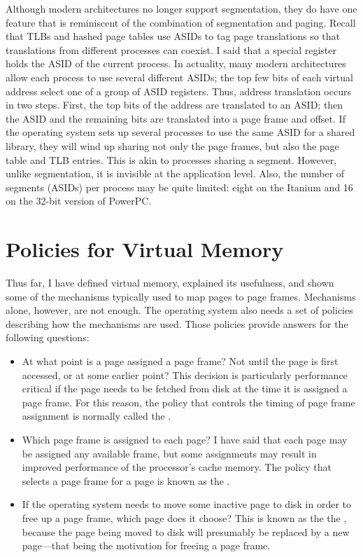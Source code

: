 Although modern architectures no longer support segmentation, they do have one
feature that is reminiscent of the combination of segmentation and
paging.  Recall that TLBs and hashed page tables use ASIDs to tag page
translations so that translations from different processes can
coexist.  I said that a special register holds the ASID of the
current process.  In actuality, many modern architectures allow each
process to use several different ASIDs; the top few bits of each
virtual address select one of a group of ASID registers.  Thus,
address translation occurs in two steps.  First, the top bits of the
address are translated to an ASID; then the ASID and the remaining
bits are translated into a page frame and offset.  If the operating
system sets up several processes to use the same ASID for a shared
library, they will wind up sharing not only the page frames, but also
the page table and TLB entries.  This is akin to processes sharing a
segment.  However, unlike segmentation, it is invisible at the
application level.  Also, the number of segments (ASIDs) per process
may be quite limited: eight on the Itanium and 16 on the 32-bit
version of PowerPC.

\section{Policies for Virtual Memory}\label{vm-policies-section}

Thus far, I have defined virtual memory, explained its usefulness,
and shown some of the mechanisms typically used to map pages to page
frames.  Mechanisms alone, however, are not enough.  The operating
system also needs a set of policies describing how the mechanisms are
used.  Those policies provide answers for the following questions:
\begin{itemize}
\item
At what point is a page assigned a page frame?  Not until the page is
first accessed, or at some earlier point?  This decision is
particularly performance critical if the page needs to be fetched from
disk at the time it is assigned a page frame.  For this reason, the
policy that controls the timing of page frame assignment is normally
called the .
\item
Which page frame is assigned to each page?  I have said that each
page may be assigned any available frame, but some assignments may
result in improved performance of the processor's cache memory.  The
policy that selects a page frame for a page is known as the
.
\item
If the operating system needs to move some inactive page to disk in
order to free up a page frame, which page does it choose?  This is
known as the the , because the page being
moved to disk will presumably be replaced by a new page---that being
the motivation for freeing a page frame.
\end{itemize}

